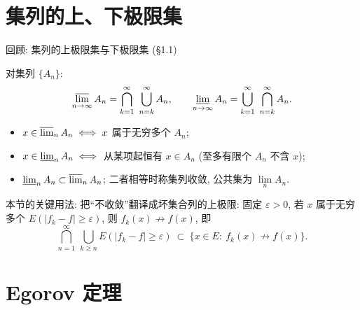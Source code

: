 
\section[上下极限]{集列的上、下极限集}


\begin{frame}{回顾: 集列的上极限集与下极限集 (\S 1.1)}

\begin{Def}[上、下极限集]
对集列 $\{A_n\}$:
\[
\varlimsup_{n\to\infty} A_n = \bigcap_{k=1}^{\infty}\ \bigcup_{n=k}^{\infty} A_n,
\qquad
\varliminf_{n\to\infty} A_n = \bigcup_{k=1}^{\infty}\ \bigcap_{n=k}^{\infty} A_n.
\]
\end{Def}

\pause

\begin{itemize}
\item $x \in \varlimsup_{n} A_n \iff x$ 属于\alert{无穷多个} $A_n$;
\item $x \in \varliminf_{n} A_n \iff$ \alert{从某项起}恒有 $x \in A_n$ (至多有限个 $A_n$ 不含 $x$);
\item $\varliminf_{n} A_n \subset \varlimsup_{n} A_n$; 二者相等时称集列收敛, 公共集为 $\lim\limits_{n} A_n$.
\end{itemize}

\pause

\begin{attnblock}
本节的关键用法: 把``不收敛''翻译成坏集合列的上极限: 固定 $\varepsilon > 0$, 若 $x$ 属于无穷多个 $E(|f_k - f| \geqslant \varepsilon)$, 则 $f_k(x) \not\to f(x)$, 即
\[
\bigcap_{n=1}^{\infty}\ \bigcup_{k \geqslant n} E(|f_k - f| \geqslant \varepsilon)
\ \subset\
\{x \in E:\ f_k(x) \not\to f(x)\}.
\]
\end{attnblock}

\end{frame}


\section{Egorov 定理}



